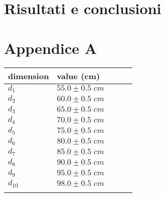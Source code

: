 \documentclass[11pt,a4paper]{article}
\begin{document}
\section{Risultati e conclusioni}

\section{Appendice A}
\begin{longtable}[]{@{}lllll@{}}
    \toprule
    dimension & value (cm) \tabularnewline
    \midrule
    \endhead
    $d_1$ & $55.0 \pm 0.5 \; cm$ \tabularnewline
    $d_2$ & $60.0 \pm 0.5 \; cm$ \tabularnewline
    $d_3$ & $65.0 \pm 0.5 \; cm$ \tabularnewline
    $d_4$ & $70.0 \pm 0.5 \; cm$ \tabularnewline
    $d_5$ & $75.0 \pm 0.5 \; cm$ \tabularnewline
    $d_6$ & $80.0 \pm 0.5 \; cm$ \tabularnewline
    $d_7$ & $85.0 \pm 0.5 \; cm$ \tabularnewline
    $d_8$ & $90.0 \pm 0.5 \; cm$ \tabularnewline
    $d_9$ & $95.0 \pm 0.5 \; cm$ \tabularnewline
    $d_{10}$ & $98.0 \pm 0.5 \; cm$ \tabularnewline
    \bottomrule
    \label{output3}
\end{longtable}
\end{document}
